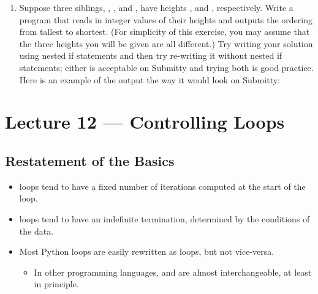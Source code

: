 \documentclass[letterpaper,10pt,english]{sphinxmanual}
\begin{document}
\begin{enumerate}
\item {} 
Suppose three siblings, , , and , have
heights ,  and , respectively. Write a program
that reads in integer values of their heights and outputs
the ordering from tallest to shortest. (For simplicity of
this exercise, you may assume that the three heights you will be
given are all different.) Try writing your solution using nested
if statements and then try re-writing it without nested if statements;
either is acceptable on Submitty and trying both is good practice.
Here is an example of the output the way it would look on Submitty:

\begin{sphinxVerbatim}[commandchars=\\\{\}]
 
 
 
\end{sphinxVerbatim}

\end{enumerate}


\chapter{Lecture 12 — Controlling Loops}
\label{\detokenize{lecture_notes/lec12_loops2_for_double:lecture-12-controlling-loops}}\label{\detokenize{lecture_notes/lec12_loops2_for_double::doc}}

\section{Restatement of the Basics}
\label{\detokenize{lecture_notes/lec12_loops2_for_double:restatement-of-the-basics}}\begin{itemize}
\item {} 
 loops tend to have a fixed number of iterations computed at
the start of the loop.

\item {} 
 loops tend to have an indefinite termination, determined by
the conditions of the data.

\item {} 
Most Python  loops are easily rewritten as  loops,
but not vice-versa.
\begin{itemize}
\item {} 
In other programming languages,  and  are almost
interchangeable, at least in principle.

\end{itemize}

\end{itemize}
\end{document}
